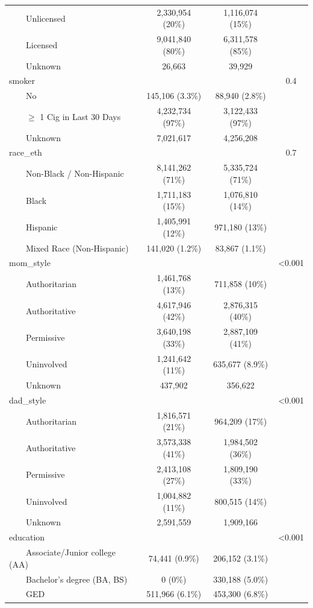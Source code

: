 \documentclass[
]{article}
\begin{document}
\begin{table}[t]
\begin{tabular*}{\linewidth}{@{\extracolsep{\fill}}lccc}
    Unlicensed & 2,330,954 (20\%) & 1,116,074 (15\%) &  \\ 
    Licensed & 9,041,840 (80\%) & 6,311,578 (85\%) &  \\ 
    Unknown & 26,663 & 39,929 &  \\ 
smoker &  &  & 0.4 \\ 
    No & 145,106 (3.3\%) & 88,940 (2.8\%) &  \\ 
    \ensuremath{\geq} 1 Cig in Last 30 Days & 4,232,734 (97\%) & 3,122,433 (97\%) &  \\ 
    Unknown & 7,021,617 & 4,256,208 &  \\ 
race\_eth &  &  & 0.7 \\ 
    Non-Black / Non-Hispanic & 8,141,262 (71\%) & 5,335,724 (71\%) &  \\ 
    Black & 1,711,183 (15\%) & 1,076,810 (14\%) &  \\ 
    Hispanic & 1,405,991 (12\%) & 971,180 (13\%) &  \\ 
    Mixed Race (Non-Hispanic) & 141,020 (1.2\%) & 83,867 (1.1\%) &  \\ 
mom\_style &  &  & <0.001 \\ 
    Authoritarian & 1,461,768 (13\%) & 711,858 (10\%) &  \\ 
    Authoritative & 4,617,946 (42\%) & 2,876,315 (40\%) &  \\ 
    Permissive & 3,640,198 (33\%) & 2,887,109 (41\%) &  \\ 
    Uninvolved & 1,241,642 (11\%) & 635,677 (8.9\%) &  \\ 
    Unknown & 437,902 & 356,622 &  \\ 
dad\_style &  &  & <0.001 \\ 
    Authoritarian & 1,816,571 (21\%) & 964,209 (17\%) &  \\ 
    Authoritative & 3,573,338 (41\%) & 1,984,502 (36\%) &  \\ 
    Permissive & 2,413,108 (27\%) & 1,809,190 (33\%) &  \\ 
    Uninvolved & 1,004,882 (11\%) & 800,515 (14\%) &  \\ 
    Unknown & 2,591,559 & 1,909,166 &  \\ 
education &  &  & <0.001 \\ 
    Associate/Junior college (AA) & 74,441 (0.9\%) & 206,152 (3.1\%) &  \\ 
    Bachelor's degree (BA, BS) & 0 (0\%) & 330,188 (5.0\%) &  \\ 
    GED & 511,966 (6.1\%) & 453,300 (6.8\%) &  \\ 

\end{tabular*}
\end{table}
\end{document}
